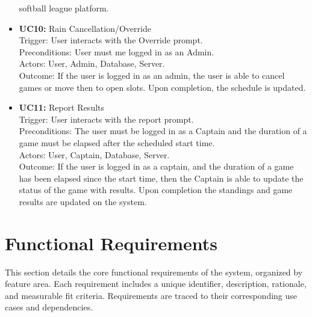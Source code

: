 \documentclass[12pt, titlepage]{article}
\begin{document}
\begin{itemize}
	softball league platform.
\item \textbf{UC10:} Rain Cancellation/Override \\
	Trigger: User interacts with the Override prompt.\\
	Preconditions: User must me logged in as an Admin.\\
	Actors: User, Admin, Database, Server.\\
	Outcome: If the user is logged in as an admin, the user is able to cancel games or move then to open
	slots. Upon completion, the schedule is updated.
\item \textbf{UC11:} Report Results \\
	Trigger: User interacts with the report prompt.\\
	Preconditions: The user must be logged in as a Captain and the duration of a game must be elapsed after
	the scheduled start time.\\
	Actors: User, Captain, Database, Server.\\
	Outcome: If the user is logged in as a captain, and the duration of a game has been elapsed since the 
	start time, then the Captain is able to update the status of the game with results. Upon completion 
	the standings and game results are updated on the system.
\end{itemize}


\section{Functional Requirements}
This section details the core functional requirements of the system, organized by feature area. Each requirement includes a unique identifier, description, rationale, and measurable fit criteria. Requirements are traced to their corresponding use cases and dependencies.
\end{document}
